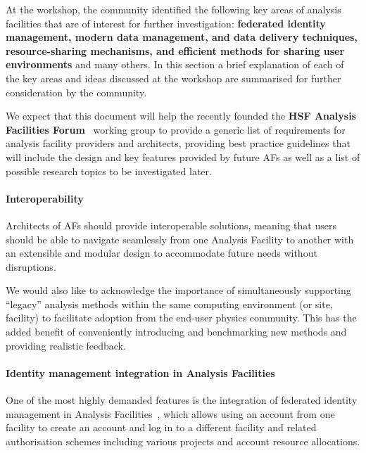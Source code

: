 \documentclass[a4paper,11pt]{article}
\begin{document}
At the workshop, the community identified the following key areas of
analysis facilities that are of interest for further investigation:
\textbf{federated identity management, modern data management, and data
delivery techniques, resource-sharing mechanisms, and efficient methods
for sharing user environments} and many others. In this section a brief
explanation of each of the key areas and ideas discussed at the workshop are
summarised for further consideration by the community.

We expect that this document will help the recently founded the
\textbf{HSF Analysis Facilities Forum}~\cite{hsfaff} working group to provide
a generic list of requirements for analysis facility providers and
architects, providing best practice guidelines that will include the
design and key features provided by future AFs as well as a list of
possible research topics to be investigated later.

\hypertarget{interoperability}{%
\paragraph{Interoperability}\label{interoperability}}

Architects of AFs should provide interoperable solutions, meaning that
users should be able to navigate seamlessly from one Analysis Facility
to another with an extensible and modular design to accommodate future
needs without disruptions.

We would also like to acknowledge the importance of simultaneously
supporting ``leg\-acy'' analysis methods within the same computing
environment (or site, facility) to facilitate adoption from the end-user
physics community. This has the added benefit of conveniently
introducing and benchmarking new methods and providing realistic
feedback.

\hypertarget{identity-management-integration-in-analysis-facilities}{%
\paragraph{Identity management integration in Analysis
Facilities}\label{identity-management-integration-in-analysis-facilities}}

One of the most highly demanded features is the integration of federated
identity management in Analysis Facilities~\cite{broeder2012federated}, which allows using an
account from one facility to create an account and log in to a different
facility and related authorisation schemes including various projects
and account resource allocations.
\end{document}
